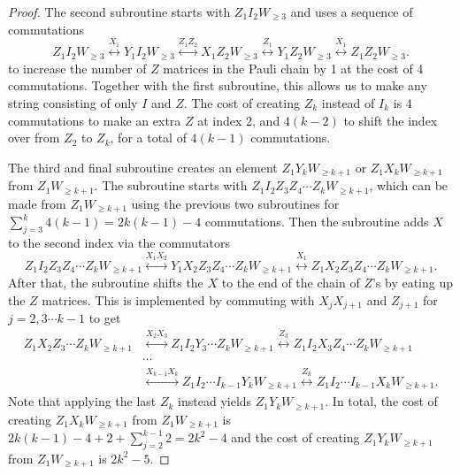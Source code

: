 \documentclass[12pt, a4-paper]{amsart}
\numberwithin{equation}{section}
\begin{document}
\begin{proof}
The second subroutine starts with $Z_1 I_2 W_{\geq 3}$ and uses a sequence of commutations
\begin{equation}
    Z_1 I_2 W_{\geq 3} \stackrel{X_1}{\longleftrightarrow} Y_1 I_2 W_{\ge 3} \stackrel{Z_1 Z_2}{\longleftrightarrow} X_1 Z_2 W_{\ge 3} \stackrel{Z_1}{\longleftrightarrow}Y_1 Z_2 W_{\ge 3} \stackrel{X_1}{\longleftrightarrow} Z_1 Z_2 W_{\geq 3}.
\end{equation}
to increase the number of $Z$ matrices in the Pauli chain by 1 at the cost of 4 commutations. Together with the first subroutine, this allows us to make any string consisting of only $I$ and $Z$. The cost of creating $Z_k$ instead of $I_k$ is 4 commutations to make an extra $Z$ at index 2, and $4(k-2)$ to shift the index over from $Z_2$ to $Z_k$, for a total of $4(k-1)$ commutations.

The third and final subroutine creates an element $Z_1 Y_k W_{\geq k+1}$ or $Z_1 X_k W_{\geq k+1}$ from $Z_1 W_{\geq k+1}$. 
The subroutine starts with $Z_1 I_2 Z_3 Z_4 \cdots Z_k W_{\geq k+1}$, which can be made from $Z_1 W_{\geq k+1}$ using the previous two subroutines for $\sum_{j=3}^k 4(k-1) = 2k(k-1)-4$ commutations. Then the subroutine adds $X$ to the second index via the commutators
\begin{equation}
    Z_1 I_2 Z_3 Z_4 \cdots Z_k W_{\geq k+1} \stackrel{X_1 X_2}{\longleftrightarrow} Y_1 X_2 Z_3 Z_4 \cdots Z_k W_{\geq k+1} \stackrel{X_1}{\longleftrightarrow} Z_1 X_2 Z_3 Z_4 \cdots Z_k W_{\geq k+1}.
\end{equation}
After that, the subroutine shifts the $X$ to the end of the chain of $Z$'s by eating up the $Z$ matrices. This is implemented by commuting with $X_j X_{j+1}$ and $Z_{j+1}$ for $j = 2, 3 \cdots k-1$ to get
\begin{equation}
\begin{aligned}
        Z_1 X_2 Z_3 \cdots Z_kW_{\geq k+1}  &\stackrel{X_2 X_3}{\longleftrightarrow} Z_1 I_2 Y_3 \cdots Z_kW_{\geq k+1}  \stackrel{Z_3}{\longleftrightarrow} Z_1 I_2 X_3 Z_4 \cdots Z_kW_{\geq k+1} \\
        &\cdots  \\
        &\stackrel{X_{k-1} X_k}{\longleftrightarrow} Z_1 I_2 \cdots I_{k-1} Y_k W_{\geq k+1} \stackrel{Z_k}{\longleftrightarrow} Z_1 I_2 \cdots I_{k-1} X_k W_{\geq k+1}. 
\end{aligned}
\end{equation}
Note that applying the last $Z_k$ instead yields  $Z_1 Y_k W_{\geq k+1}$. In total, the cost of creating $Z_1 X_k W_{\geq k+1}$ from $Z_1 W_{\geq k+1}$ is $2k(k-1) - 4 + 2 + \sum_{j=2}^{k-1} 2 = 2k^2-4$ and the cost of creating $Z_1 Y_k W_{\geq k+1}$ from $Z_1 W_{\geq k+1}$ is $2k^2-5$.


\end{proof}
\end{document}
